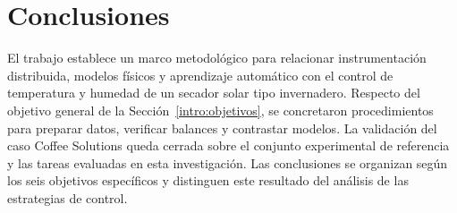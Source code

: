 \chapter{Conclusiones}
\label{ch:conclusiones}

El trabajo establece un marco metodológico para relacionar instrumentación distribuida, modelos físicos y aprendizaje automático con el control de temperatura y humedad de un secador solar tipo invernadero. Respecto del objetivo general de la Sección~\ref{intro:objetivos}, se concretaron procedimientos para preparar datos, verificar balances y contrastar modelos. La validación del caso Coffee Solutions queda cerrada sobre el conjunto experimental de referencia y las tareas evaluadas en esta investigación. Las conclusiones se organizan según los seis objetivos específicos y distinguen este resultado del análisis de las estrategias de control.

